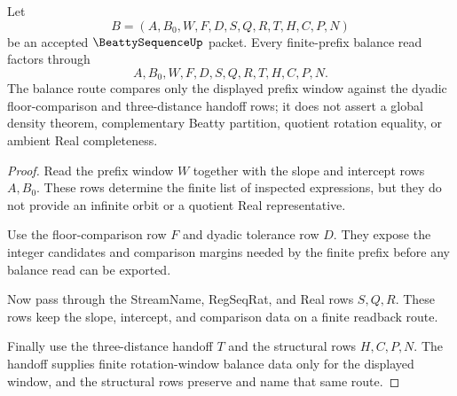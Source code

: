 \begin{theorem}
\label{thm:beatty-sequence-finite-prefix-balance}
Let
$$
B=(A,B_0,W,F,D,S,Q,R,T,H,C,P,N)
$$
be an accepted $\BeattySequenceUp$ packet. Every finite-prefix balance read factors through
$$
A,B_0,W,F,D,S,Q,R,T,H,C,P,N .
$$
The balance route compares only the displayed prefix window against the dyadic floor-comparison and three-distance handoff rows; it does not assert a global density theorem, complementary Beatty partition, quotient rotation equality, or ambient Real completeness.
\end{theorem}
\begin{proof}
Read the prefix window $W$ together with the slope and intercept rows $A,B_0$. These rows determine the finite list of inspected expressions, but they do not provide an infinite orbit or a quotient Real representative.

Use the floor-comparison row $F$ and dyadic tolerance row $D$. They expose the integer candidates and comparison margins needed by the finite prefix before any balance read can be exported.

Now pass through the StreamName, RegSeqRat, and Real rows $S,Q,R$. These rows keep the slope, intercept, and comparison data on a finite readback route.

Finally use the three-distance handoff $T$ and the structural rows $H,C,P,N$. The handoff supplies finite rotation-window balance data only for the displayed window, and the structural rows preserve and name that same route.
\end{proof}

